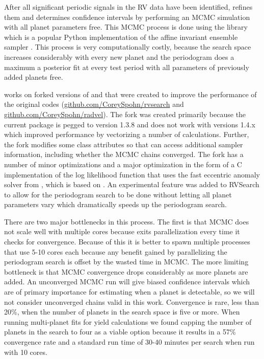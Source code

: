 After all significant periodic signals in the RV data have been identified,
 refines them and determines confidence intervals by performing
an MCMC simulation with all planet parameters free. This MCMC process is done
using the  library \citep{emcee} which is a popular Python
implementation of the affine invariant ensemble sampler \citep{Goodman2010}.
This process is very computationally costly, because the search space increases
considerably with every new planet and the periodogram does a maximum a
posterior fit at every test period with all parameters of previously added
planets free.

 works on forked versions of  and
 that were created to improve the performance of the original
codes (\url{github.com/CoreySpohn/rvsearch} and
\url{github.com/CoreySpohn/radvel}). The  fork was created
primarily because the current  package is pegged to
 version 1.3.8 and does not work with  versions 1.4.x
which improved performance by vectorizing a number of calculations. Further,
the fork modifies some class attributes so that  can access
additional sampler information, including whether the MCMC chains converged.
The  fork has a number of minor optimizations and a major
optimization in the form of a C implementation of the log likelihood function
that uses the fast eccentric anomaly solver from 
\citep{brandtOrvaraEfficient2021}, which is based on
\citet{raposo-pulidoEfficientCode2017}. An experimental feature was added to
RVSearch to allow for the periodogram search to be done without letting all
planet parameters vary which dramatically speeds up the periodogram search.

There are two major bottlenecks in this process. The first is that MCMC does
not scale well with multiple cores because  exits parallelization
every time it checks for convergence. Because of this it is better to spawn
multiple processes that use 5-10 cores each because any benefit gained by
parallelizing the periodogram search is offset by the wasted time in MCMC. The
more limiting bottleneck is that MCMC convergence drops considerably as more
planets are added. An unconverged MCMC run will give biased confidence
intervals which are of primary importance for estimating when a planet is
detectable, so we will not consider unconverged chains valid in this work.
Convergence is rare, less than 20\%, when the number of planets in the search
space is five or more. When running multi-planet fits for yield calculations we
found capping the number of planets in the search to four as a viable option
because it results in a 57\% convergence rate and a standard run time of 30-40
minutes per search when run with 10 cores.

